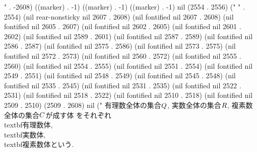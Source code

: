 " . -2608) ((marker) . -1) ((marker) . -1) ((marker) . -1) nil (2554 . 2556) (" " . 2554) (nil rear-nonsticky nil 2607 . 2608) (nil fontified nil 2607 . 2608) (nil fontified nil 2605 . 2607) (nil fontified nil 2602 . 2605) (nil fontified nil 2601 . 2602) (nil fontified nil 2589 . 2601) (nil fontified nil 2587 . 2589) (nil fontified nil 2586 . 2587) (nil fontified nil 2575 . 2586) (nil fontified nil 2573 . 2575) (nil fontified nil 2572 . 2573) (nil fontified nil 2560 . 2572) (nil fontified nil 2555 . 2560) (nil fontified nil 2554 . 2555) (nil fontified nil 2551 . 2554) (nil fontified nil 2549 . 2551) (nil fontified nil 2548 . 2549) (nil fontified nil 2545 . 2548) (nil fontified nil 2535 . 2545) (nil fontified nil 2531 . 2535) (nil fontified nil 2522 . 2531) (nil fontified nil 2518 . 2522) (nil fontified nil 2510 . 2518) (nil fontified nil 2509 . 2510) (2509 . 2608) nil (" 有理数全体の集合$\\Q$, 実数全体の集合$\\R$, 複素数全体の集合$\\C$が成す体
 をそれぞれ\\textbf{有理数体}, \\textbf{実数体}, \\textbf{複素数体}という. 
